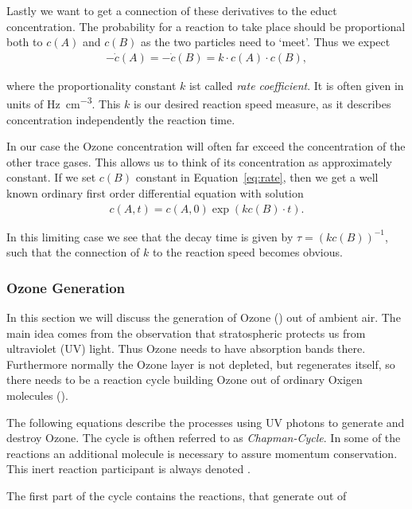 Lastly we want to get a connection of these derivatives to the educt
concentration. The probability for a reaction to take place should be
proportional both to $c(A)$ and $c(B)$ as the two particles need to
`meet'. Thus we expect
\begin{align}
  -\dot c(A) = - \dot c(B) = k \cdot c(A) \cdot c(B), \label{eq:rate}
\end{align}

where the proportionality constant $k$ ist called \emph{rate
  coefficient}. It is often given in units of
\si{\hertz\per\cubic\centi\meter}. This $k$ is our desired reaction
speed measure, as it describes concentration independently the
reaction time. 

In our case the Ozone concentration will often far exceed the
concentration of the other trace gases. This allows us to think of its
concentration as approximately constant. If we set $c(B)$ constant in
Equation~\eqref{eq:rate}, then we get a well known ordinary first
order differential equation with solution
\begin{align*}
  c(A,t) = c(A,0)\exp(kc(B)\cdot t).
\end{align*}

In this limiting case we see that the decay time is given by $\tau =
(kc(B))^{-1}$, such that the connection of $k$ to the reaction speed
becomes obvious.

\subsubsection{Ozone Generation}
\label{sec:theory-ozone}

In this section we will discuss the generation of Ozone () out of ambient
air. The main idea comes from the observation that stratospheric
 protects us from ultraviolet (UV) light. Thus Ozone needs to
have absorption bands there. Furthermore normally the Ozone layer is
not depleted, but regenerates itself, so there needs to be a reaction
cycle building Ozone out of ordinary Oxigen molecules ().

The following equations describe the processes using UV photons to
generate and destroy Ozone. The cycle is ofthen referred to as
\emph{Chapman-Cycle}. In some of the reactions an
additional molecule is necessary to assure momentum conservation. This
inert reaction participant is always denoted .

The first part of the cycle contains the reactions, that generate
 out of 

